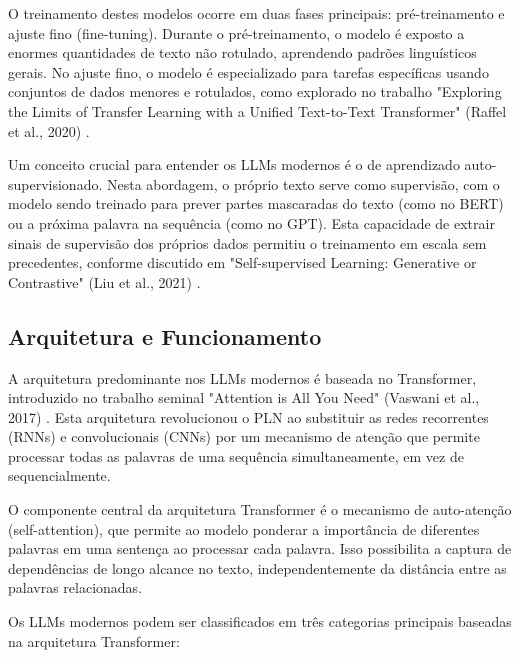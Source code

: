 \documentclass[tcc,capa]{texufpel}
\begin{document}
O treinamento destes modelos ocorre em duas fases principais: pré-treinamento e ajuste fino (fine-tuning). Durante o pré-treinamento, o modelo é exposto a enormes quantidades de texto não rotulado, aprendendo padrões linguísticos gerais. No ajuste fino, o modelo é especializado para tarefas específicas usando conjuntos de dados menores e rotulados, como explorado no trabalho "Exploring the Limits of Transfer Learning with a Unified Text-to-Text Transformer" (Raffel et al., 2020) \cite{raffel2020exploring}.

Um conceito crucial para entender os LLMs modernos é o de aprendizado auto-supervisionado. Nesta abordagem, o próprio texto serve como supervisão, com o modelo sendo treinado para prever partes mascaradas do texto (como no BERT) ou a próxima palavra na sequência (como no GPT). Esta capacidade de extrair sinais de supervisão dos próprios dados permitiu o treinamento em escala sem precedentes, conforme discutido em "Self-supervised Learning: Generative or Contrastive" (Liu et al., 2021) \cite{liu2021self}.

\subsection{Arquitetura e Funcionamento}

A arquitetura predominante nos LLMs modernos é baseada no Transformer, introduzido no trabalho seminal "Attention is All You Need" (Vaswani et al., 2017) \cite{vaswani2017attention}. Esta arquitetura revolucionou o PLN ao substituir as redes recorrentes (RNNs) e convolucionais (CNNs) por um mecanismo de atenção que permite processar todas as palavras de uma sequência simultaneamente, em vez de sequencialmente.

O componente central da arquitetura Transformer é o mecanismo de auto-atenção (self-attention), que permite ao modelo ponderar a importância de diferentes palavras em uma sentença ao processar cada palavra. Isso possibilita a captura de dependências de longo alcance no texto, independentemente da distância entre as palavras relacionadas.

Os LLMs modernos podem ser classificados em três categorias principais baseadas na arquitetura Transformer:
\end{document}
